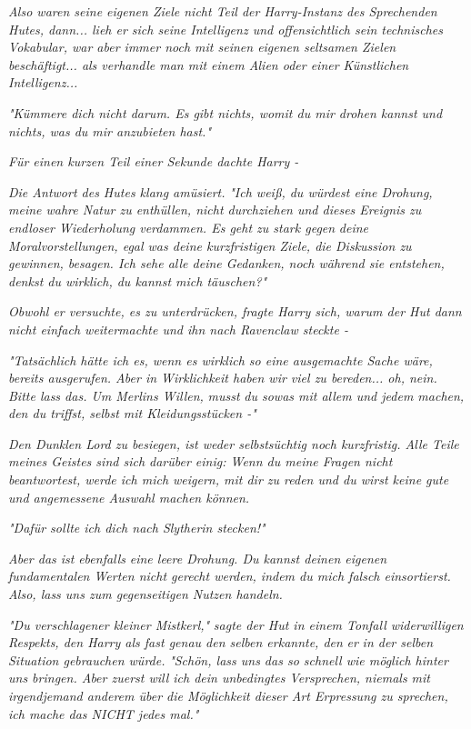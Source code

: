 {\emph{Also waren seine eigenen Ziele nicht Teil der Harry-Instanz des Sprechenden Hutes, dann... lieh er sich seine Intelligenz und offensichtlich sein technisches Vokabular, war aber immer noch mit seinen eigenen seltsamen Zielen beschäftigt... als verhandle man mit einem Alien oder einer Künstlichen Intelligenz...}

\emph{\emph{"Kümmere dich nicht darum. Es gibt nichts, womit du mir drohen kannst und nichts, was du mir anzubieten hast."}}

\emph{Für einen kurzen Teil einer Sekunde dachte Harry -}

\emph{Die Antwort des Hutes klang amüsiert.} \emph{\emph{"Ich weiß, du würdest eine Drohung, meine wahre Natur zu enthüllen, nicht durchziehen und dieses Ereignis zu endloser Wiederholung verdammen. Es geht zu stark gegen}} \emph{\emph{deine Moralvorstellungen, egal was deine kurzfristigen Ziele, die Diskussion zu gewinnen, besagen. Ich sehe alle deine Gedanken, noch während sie entstehen, denkst du wirklich, du kannst mich täuschen?"}}

\emph{Obwohl er versuchte, es zu unterdrücken, fragte Harry sich, warum der Hut dann nicht einfach weitermachte und ihn nach Ravenclaw steckte -}

\emph{\emph{"Tatsächlich hätte ich es, wenn es wirklich so eine ausgemachte Sache wäre, bereits ausgerufen. Aber in Wirklichkeit haben wir viel zu bereden... oh, nein. Bitte lass das. Um Merlins Willen,}} \emph{musst} \emph{\emph{du sowas mit allem und jedem machen, den du triffst, selbst mit Kleidungsstücken -"}}

\emph{Den Dunklen Lord zu besiegen, ist weder selbstsüchtig noch kurzfristig. Alle Teile meines Geistes sind sich darüber einig: Wenn du meine Fragen nicht beantwortest, werde ich mich weigern, mit dir zu reden und du wirst keine gute und angemessene Auswahl machen können.}

\emph{"Dafür sollte ich dich nach Slytherin stecken!"}

\emph{Aber das ist} \emph{ebenfalls} \emph{\emph{eine leere Drohung. Du kannst deinen eigenen fundamentalen Werten nicht gerecht werden, indem du mich falsch einsortierst. Also, lass uns zum gegenseitigen Nutzen handeln.}}

\emph{"Du verschlagener kleiner Mistkerl,"} \emph{sagte der Hut in einem Tonfall widerwilligen Respekts, den Harry als fast genau den selben erkannte, den} \emph{\emph{er}} \emph{in der selben Situation gebrauchen würde.} \emph{\emph{"Schön, lass uns das so schnell wie möglich hinter uns bringen. Aber zuerst will ich dein unbedingtes Versprechen, niemals mit irgendjemand anderem über die Möglichkeit dieser Art Erpressung zu sprechen, ich mache das NICHT jedes mal."}}

}
